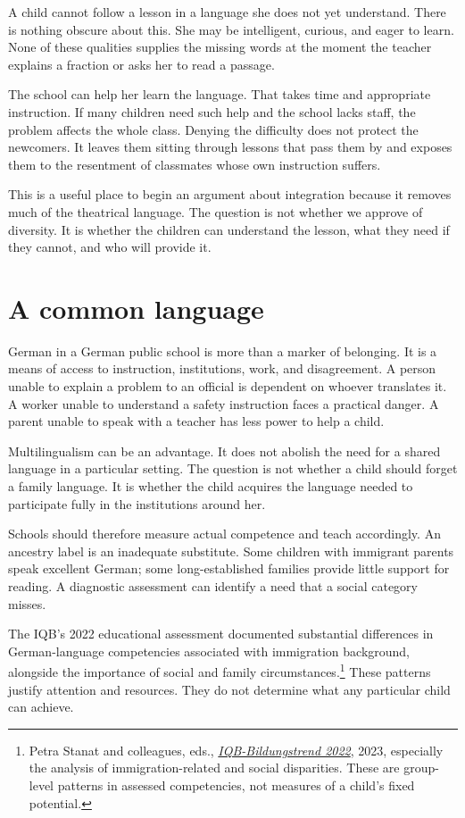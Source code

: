 \documentclass[12pt,a4paper]{book}
\begin{document}
A child cannot follow a lesson in a language she does not yet understand. There is nothing obscure about this. She may be intelligent, curious, and eager to learn. None of these qualities supplies the missing words at the moment the teacher explains a fraction or asks her to read a passage.

The school can help her learn the language. That takes time and appropriate instruction. If many children need such help and the school lacks staff, the problem affects the whole class. Denying the difficulty does not protect the newcomers. It leaves them sitting through lessons that pass them by and exposes them to the resentment of classmates whose own instruction suffers.

This is a useful place to begin an argument about integration because it removes much of the theatrical language. The question is not whether we approve of diversity. It is whether the children can understand the lesson, what they need if they cannot, and who will provide it.

\section*{A common language}

German in a German public school is more than a marker of belonging. It is a means of access to instruction, institutions, work, and disagreement. A person unable to explain a problem to an official is dependent on whoever translates it. A worker unable to understand a safety instruction faces a practical danger. A parent unable to speak with a teacher has less power to help a child.

Multilingualism can be an advantage. It does not abolish the need for a shared language in a particular setting. The question is not whether a child should forget a family language. It is whether the child acquires the language needed to participate fully in the institutions around her.

Schools should therefore measure actual competence and teach accordingly. An ancestry label is an inadequate substitute. Some children with immigrant parents speak excellent German; some long-established families provide little support for reading. A diagnostic assessment can identify a need that a social category misses.

The IQB's 2022 educational assessment documented substantial differences in German-language competencies associated with immigration background, alongside the importance of social and family circumstances.\footnote{Petra Stanat and colleagues, eds., \href{https://www.iqb.hu-berlin.de/media/documents/IQB_Bildungstrend2022_Berichtsband.pdf}{\emph{IQB-Bildungstrend 2022}}, 2023, especially the analysis of immigration-related and social disparities. These are group-level patterns in assessed competencies, not measures of a child's fixed potential.} These patterns justify attention and resources. They do not determine what any particular child can achieve.
\end{document}
